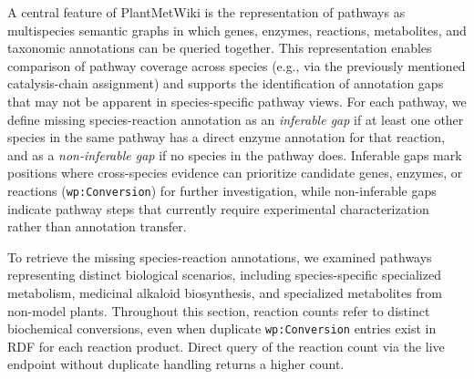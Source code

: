 \documentclass[11pt,a4paper]{article}
\begin{document}
A central feature of PlantMetWiki is the representation of pathways as multispecies semantic graphs
in which genes, enzymes, reactions, metabolites, and taxonomic annotations can be queried together.
This representation enables comparison of pathway coverage across species (e.g., via the previously
mentioned catalysis-chain assignment) and supports the identification of annotation gaps that may not
be apparent in species-specific pathway views. For each pathway, we define missing species-reaction
annotation as an \emph{inferable gap} if at least one other species in the same pathway has a direct
enzyme annotation for that reaction, and as a \emph{non-inferable gap} if no species in the pathway
does. Inferable gaps mark positions where cross-species evidence can prioritize candidate genes,
enzymes, or reactions (\texttt{wp:Conversion}) for further investigation, while non-inferable gaps
indicate pathway steps that currently require experimental characterization rather than annotation
transfer. 

To retrieve the missing species-reaction annotations, we examined pathways representing distinct biological
scenarios, including species-specific specialized metabolism, medicinal alkaloid biosynthesis, and
specialized metabolites from non-model plants. Throughout this section, reaction counts refer to distinct biochemical conversions, even when duplicate \texttt{wp:Conversion} entries exist in RDF for each reaction product. Direct query of the reaction count via the live endpoint without duplicate handling returns a higher count. 
\end{document}
